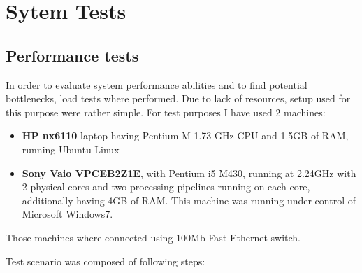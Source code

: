 %


\section{Sytem Tests}
\label{sec:tests}

\subsection{Performance tests}

In order to evaluate system performance abilities and to find potential bottlenecks, load tests where performed. Due to lack of resources, setup used for this purpose were rather simple. For test purposes I have used 2 machines: 

\begin{itemize}
\item {\bf HP nx6110} laptop having Pentium M 1.73 GHz CPU and 1.5GB of RAM, running Ubuntu Linux
\item {\bf Sony Vaio VPCEB2Z1E}, with Pentium i5 M430, running at 2.24GHz with 2 physical cores and two processing pipelines running on each core, additionally having 4GB of RAM. This machine was running under control of Microsoft Windows7.
\end{itemize}

Those machines where connected using 100Mb Fast Ethernet switch.

Test scenario was composed of following steps:


